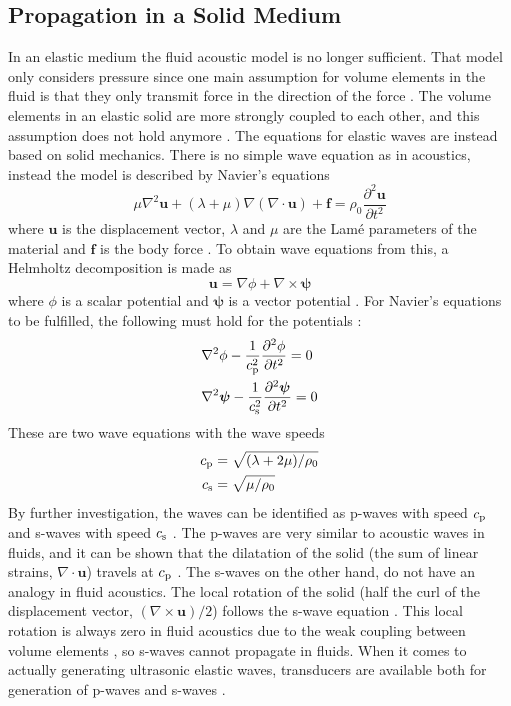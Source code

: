 \documentclass[11pt,twoside]{eitExjobb}
\begin{document}
	\subsection{Propagation in a Solid Medium \label{sec:th-prop-solid}}
	In an elastic medium the fluid acoustic model is no longer sufficient. That model only considers pressure since one main assumption for volume elements in the fluid is that they only transmit force in the direction of the force \cite{Kaufman2000}. The volume elements in an elastic solid are more strongly coupled to each other, and this assumption does not hold anymore \cite{Kaufman2005}. The equations for elastic waves are instead based on solid mechanics. There is no simple wave equation as in acoustics, instead the model is described by Navier's equations
	\begin{equation*}
		\mu \nabla^2 \bm{u} + (\lambda+\mu) \nabla (\nabla \cdot \bm{u}) + \bm{f} = \rho_0 \frac{\partial^2 \bm{u}}{\partial t^2}
	\end{equation*}
	where $\bm{u}$ is the displacement vector, $\lambda$ and $\mu$ are the Lamé parameters of the material and $\bm{f}$ is the body force \cite{Schmerr2016}. To obtain wave equations from this, a Helmholtz decomposition is made as
	\begin{equation*}
		\bm{u} = \nabla \phi + \nabla \times \bm{\psi}
	\end{equation*}
	where $\phi$ is a scalar potential and $\bm{\psi}$ is a vector potential \cite{Schmerr2016}. For Navier's equations to be fulfilled, the following must hold for the potentials \cite{Schmerr2016}:
	\begin{align*}
		&\nabla^2 \phi - \frac{1}{c_{\mathrm{p}}^2} \frac{\partial^2 \phi}{\partial t^2} = 0 \\
		&\nabla^2 \bm{\psi} - \frac{1}{c_{\mathrm{s}}^2} \frac{\partial^2 \bm{\psi}}{\partial t^2} = 0
	\end{align*}
	These are two wave equations with the wave speeds \cite{Schmerr2016}
	\begin{align*}
		c_{\mathrm{p}} &= \sqrt{(\lambda + 2\mu)/\rho_0} \\
		c_{\mathrm{s}} &= \sqrt{\mu/\rho_0}
	\end{align*}
	By further investigation, the waves can be identified as p-waves with speed $c_{\mathrm{p}}$ and s-waves with speed $c_{\mathrm{s}}$ \cite{Schmerr2016}. The p-waves are very similar to acoustic waves in fluids, and it can be shown that the dilatation of the solid (the sum of linear strains, $\nabla \cdot \bm{u}$) travels at $c_{\mathrm{p}}$ \cite{Schmerr2016}. The s-waves on the other hand, do not have an analogy in fluid acoustics. The local rotation of the solid (half the curl of the displacement vector, $(\nabla \times \bm{u})/2$) follows the s-wave equation \cite{Schmerr2016}. This local rotation is always zero in fluid acoustics due to the weak coupling between volume elements \cite{Kaufman2000}, so s-waves cannot propagate in fluids. When it comes to actually generating ultrasonic elastic waves, transducers are available both for generation of p-waves and s-waves \cite{Schmerr2016}.
	
\end{document}
